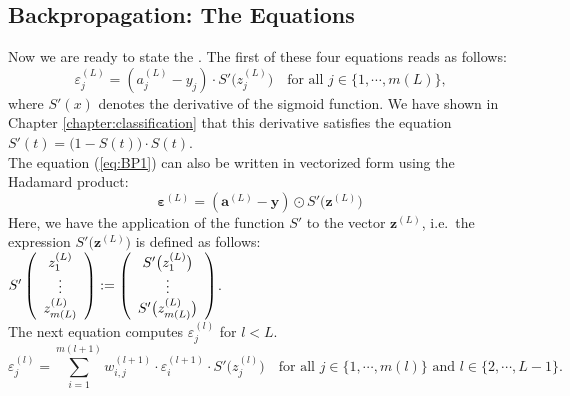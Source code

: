 \subsection{Backpropagation: The Equations}
Now we are ready to state the .  
The first of these four equations reads as follows:
\begin{equation}
  \label{eq:BP1}
  \varepsilon^{(L)}_j = (a_j^{(L)} - y_j) \cdot S'\bigl(z_j^{(L)}\bigr)
 \quad \mbox{for all $j \in \{1, \cdots, m(L)\}$,}
  \tag{BP1}
\end{equation}
where $S'(x)$ denotes the derivative of the sigmoid function.  We have shown in Chapter
\ref{chapter:classification} that this derivative satisfies the equation
\\[0.2cm]
\hspace*{1.3cm}
$S'(t) = \bigl(1 - S(t)\bigr) \cdot S(t)$.
\\[0.2cm]
The equation (\ref{eq:BP1}) can also be written in vectorized form using the Hadamard product:
\begin{equation}
  \label{eq:BP1s}
\boldsymbol{\varepsilon}^{(L)} = (\mathbf{a}^{(L)} - \mathbf{y}) \odot S'\bigl(\mathbf{z}^{(L)}\bigr)  
\tag{BP1v}
\end{equation}
Here, we have  the application of the function $S'$ to the vector $\mathbf{z}^{(L)}$, i.e.~the
expression $S'\bigl(\mathbf{z}^{(L)}\bigr)$ is defined as follows:
\\[0.2cm]
\hspace*{1.3cm}
$ S'\left(
  \begin{array}[c]{c}
   z_1^{(L)}      \\
   \vdots       \\
   z_{m(L)}^{(L)} 
  \end{array}
  \right) := \left(
  \begin{array}[c]{c}
   S'\bigl(z_1^{(L)}\bigr)      \\
   \vdots       \\
   S'\bigl(z_{m(L)}^{(L)}\bigr)
  \end{array}
  \right)
$.
\\[0.2cm]
The next equation computes $\varepsilon_j^{(l)}$ for $l < L$.  
\begin{equation}
  \label{eq:BP2}
  \varepsilon^{(l)}_j = \sum\limits_{i=1}^{m(l+1)} w_{i,j}^{(l+1)} \cdot \varepsilon^{(l+1)}_i \cdot
  S'\bigl(z^{(l)}_j\bigr) \quad \mbox{for all $j \in \{1, \cdots, m(l)\}$ and $l \in \{2, \cdots, L-1\}$}.
  \tag{BP2}
\end{equation}
